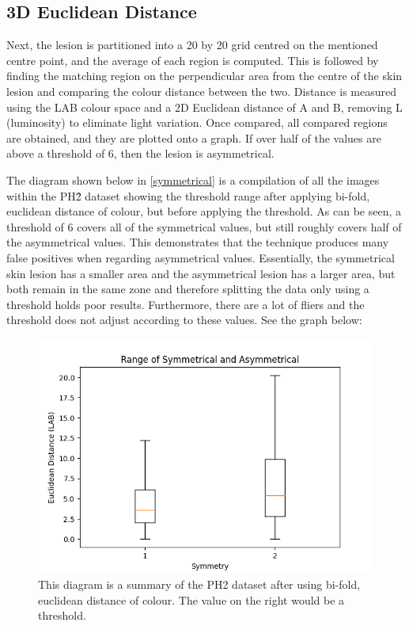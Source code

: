 
\subsection{3D Euclidean Distance}
Next, the lesion is partitioned into a 20 by 20 grid centred on the mentioned centre point, and the average of each region is computed. This is followed by finding the matching region on the perpendicular area from the centre of the skin lesion and comparing the colour distance between the two. Distance is measured using the LAB colour space and a 2D Euclidean distance of A and B, removing L (luminosity) to eliminate light variation. Once compared, all compared regions are obtained, and they are plotted onto a graph. If over half of the values are above a threshold of 6, then the lesion is asymmetrical.

The diagram shown below in \ref{symmetrical} is a compilation of all the images within the PH\^2 dataset showing the threshold range after applying bi-fold, euclidean distance of colour, but before applying the threshold. As can be seen, a threshold of 6 covers all of the symmetrical values, but still roughly covers half of the asymmetrical values. This demonstrates that the technique produces many false positives when regarding asymmetrical values.
Essentially, the symmetrical skin lesion has a smaller area and the asymmetrical lesion has a larger area, but both remain in the same zone and therefore splitting the data only using a threshold holds poor results. Furthermore, there are a lot of fliers and the threshold does not adjust according to these values. See the graph below:

\begin{figure} 
    \centering
    \includegraphics[scale=0.6]{images/symmetrical.png}
\caption{This diagram is a summary of the PH2 dataset after using bi-fold, euclidean distance of colour. The value on the right would be a threshold.}
\end{figure} \label{symmetrical}
    
